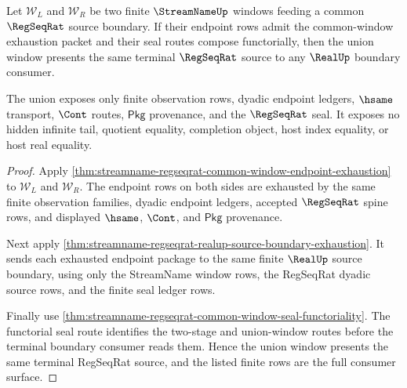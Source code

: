 \begin{theorem}
\label{thm:streamname-regseqrat-terminal-window-union}
Let $\mathcal W_L$ and $\mathcal W_R$ be two finite $\StreamNameUp$ windows
feeding a common $\RegSeqRat$ source boundary. If their endpoint rows admit the
common-window exhaustion packet and their seal routes compose functorially, then
the union window presents the same terminal $\RegSeqRat$ source to any
$\RealUp$ boundary consumer.

The union exposes only finite observation rows, dyadic endpoint ledgers,
$\hsame$ transport, $\Cont$ routes, $\mathsf{Pkg}$ provenance, and the
$\RegSeqRat$ seal. It exposes no hidden infinite tail, quotient equality,
completion object, host index equality, or host real equality.
\end{theorem}
\begin{proof}
Apply
\autoref{thm:streamname-regseqrat-common-window-endpoint-exhaustion} to
$\mathcal W_L$ and $\mathcal W_R$. The endpoint rows on both sides are exhausted
by the same finite observation families, dyadic endpoint ledgers, accepted
$\RegSeqRat$ spine rows, and displayed $\hsame$, $\Cont$, and $\mathsf{Pkg}$
provenance.

Next apply
\autoref{thm:streamname-regseqrat-realup-source-boundary-exhaustion}. It sends
each exhausted endpoint package to the same finite $\RealUp$ source boundary,
using only the StreamName window rows, the RegSeqRat dyadic source rows, and the
finite seal ledger rows.

Finally use
\autoref{thm:streamname-regseqrat-common-window-seal-functoriality}. The
functorial seal route identifies the two-stage and union-window routes before
the terminal boundary consumer reads them. Hence the union window presents the
same terminal RegSeqRat source, and the listed finite rows are the full
consumer surface.
\end{proof}

